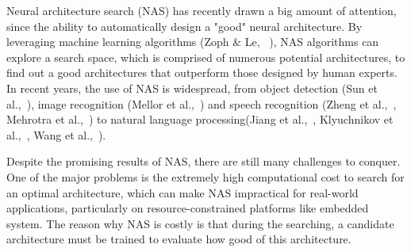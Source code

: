 \documentclass[conference]{IEEEtran}
\begin{document}
    Neural architecture search (NAS) has recently drawn a big amount of 
    attention, since the ability to automatically design a "good" neural 
    architecture. By leveraging machine learning algorithms (Zoph \& Le,
    \ \cite{https://doi.org/10.48550/arxiv.1611.01578}), NAS algorithms 
    can explore a search space, which is comprised of numerous potential 
    architectures, to find out a good architectures that outperform those 
    designed by human experts. In recent years, the use of NAS is widespread, 
    from object detection (Sun et al.,\ \cite{https://doi.org/10.48550/arxiv.2111.13336}), 
    image recognition (Mellor et al.,\ \cite{https://doi.org/10.48550/arxiv.2006.04647}) 
    and speech recognition (Zheng et al.,\ \cite{https://doi.org/10.48550/arxiv.2011.05649}, 
    Mehrotra et al.,\ \cite{mehrotra2021nasbenchasr}) to natural language 
    processing(Jiang et al.,\ \cite{jiang-etal-2019-improved}, 
    Klyuchnikov et al.,\ \cite{https://doi.org/10.48550/arxiv.2006.07116}, 
    Wang et al.,\ \cite{https://doi.org/10.48550/arxiv.2005.14187}).

    Despite the promising results of NAS, there are still many challenges 
    to conquer. One of the major problems is the extremely high computational 
    cost to search for an optimal architecture, which can make NAS impractical 
    for real-world applications, particularly on resource-constrained 
    platforms like embedded system. The reason why NAS is costly is that 
    during the searching, a candidate architecture must be trained to 
    evaluate how good of this architecture.
\end{document}

